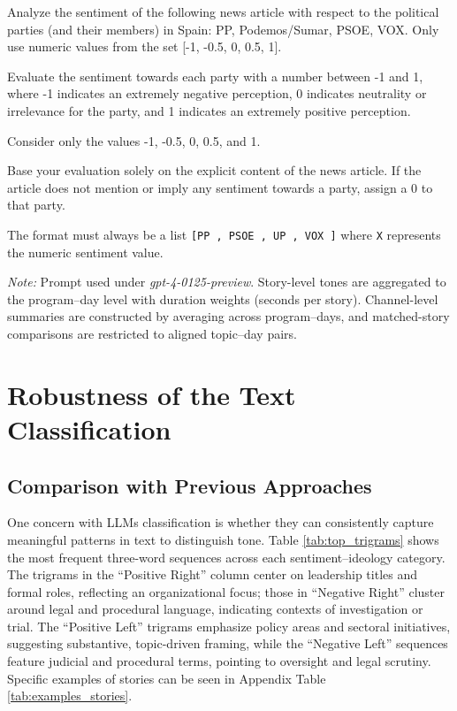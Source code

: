 \documentclass[12pt]{article}
\begin{document}
\begin{tcolorbox}[colback=blue!5!white, colframe=blue!75!black, title=Prompt]
	Analyze the sentiment of the following news article with respect to the political parties (and their members) in Spain: PP, Podemos/Sumar, PSOE, VOX. Only use numeric values from the set [-1, -0.5, 0, 0.5, 1].
	
	Evaluate the sentiment towards each party with a number between -1 and 1, where -1 indicates an extremely negative perception, 0 indicates neutrality or irrelevance for the party, and 1 indicates an extremely positive perception.
	
	Consider only the values -1, -0.5, 0, 0.5, and 1.
	
	Base your evaluation solely on the explicit content of the news article. If the article does not mention or imply any sentiment towards a party, assign a 0 to that party.
	
	The format must always be a list \texttt{[PP
		, PSOE
		, UP
		, VOX
		]} where \texttt{X} represents the numeric sentiment value.
\end{tcolorbox}

\noindent\textit{Note:} Prompt used under \textit{gpt-4-0125-preview}. Story-level tones are aggregated to the program–day level with duration weights (seconds per story). Channel-level summaries are constructed by averaging across program–days, and matched-story comparisons are restricted to aligned topic–day pairs.



\newpage




\section{Robustness of the Text Classification}

\label{sec:robustness}







\subsection{Comparison with Previous Approaches}


One concern with LLMs classification is whether they can consistently capture meaningful patterns in text to distinguish tone. Table \ref{tab:top_trigrams} shows the most frequent three-word sequences across each sentiment–ideology category. The trigrams in the “Positive Right” column center on leadership titles and formal roles, reflecting an organizational focus; those in “Negative Right” cluster around legal and procedural language, indicating contexts of investigation or trial. The “Positive Left” trigrams emphasize policy areas and sectoral initiatives, suggesting substantive, topic-driven framing, while the “Negative Left” sequences feature judicial and procedural terms, pointing to oversight and legal scrutiny. Specific examples of stories can be seen in Appendix Table \ref{tab:examples_stories}.
\end{document}
